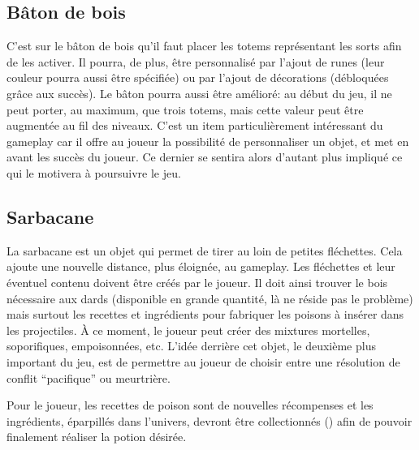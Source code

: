 \subsection{Bâton de bois}

C'est sur le bâton de bois qu'il faut placer les totems représentant les sorts afin de les activer. Il pourra, de plus, être personnalisé par l'ajout de runes (leur couleur pourra aussi être spécifiée) ou par l'ajout de décorations (débloquées grâce aux succès). Le bâton pourra aussi être amélioré: au début du jeu, il ne peut porter, au maximum, que trois totems, mais cette valeur peut être augmentée au fil des niveaux. C'est un item particulièrement intéressant du gameplay car il offre au joueur la possibilité de personnaliser un objet, et met en avant les succès du joueur. Ce dernier se sentira alors d'autant plus impliqué ce qui le motivera à poursuivre le jeu.

\subsection{Sarbacane}
La sarbacane est un objet qui permet de tirer au loin de petites fléchettes. Cela ajoute une nouvelle distance, plus éloignée, au gameplay. Les fléchettes et leur éventuel contenu doivent être créés par le joueur. Il doit ainsi trouver le bois nécessaire aux dards (disponible en grande quantité, là ne réside pas le problème) mais surtout les recettes et ingrédients pour fabriquer les poisons à insérer dans les projectiles. À ce moment, le joueur peut créer des mixtures mortelles, soporifiques, empoisonnées, etc. L'idée derrière cet objet, le deuxième plus important du jeu, est de permettre au joueur de choisir entre une résolution de conflit \enquote{pacifique} ou meurtrière.

Pour le joueur, les recettes de poison sont de nouvelles récompenses et les ingrédients, éparpillés dans l'univers, devront être collectionnés () afin de pouvoir finalement réaliser la potion désirée.


